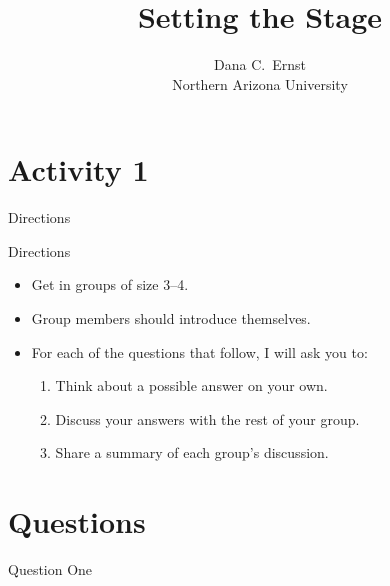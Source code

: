 \documentclass[10pt]{beamer}
\title{Setting the Stage}
\subtitle{}
\author{{\large Dana C.~Ernst}\\
Northern Arizona University}
\date{}
\begin{document}

\maketitle


\section{Activity 1}


\begin{frame}{Directions}

\vspace{3em}

\begin{block}{Directions}
\vspace{-.5em}
\begin{itemize}
\item Get in groups of size 3--4.
\item Group members should introduce themselves.
\item For each of the questions that follow, I will ask you to:
\begin{enumerate}
\item \alert{Think} about a possible answer on your own.
\item \alert{Discuss} your answers with the rest of your group.
\item \alert{Share} a summary of each group's discussion.
\end{enumerate}
\end{itemize}
\end{block}

\end{frame}


\section{Questions}


\begin{frame}{Question One}
\ 

\vfill


\vfill

\end{frame}
\end{document}
